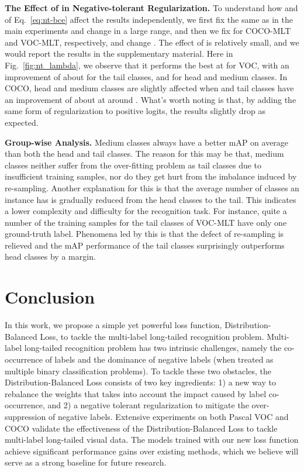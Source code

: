 \documentclass[runningheads]{llncs}
\begin{document}
\noindent\textbf{The Effect of  in Negative-tolerant Regularization.}
To understand how  and  of Eq.~\ref{eq:nt-bce} affect the results independently, we first fix  the same as in the main experiments and change  in a large range, and then we fix  for COCO-MLT and VOC-MLT, respectively, and change .
The effect of  is relatively small, and we would report the results in the supplementary material.
Here in Fig.~\ref{fig:nt_lambda}, we observe that it performs the best at  for VOC, with an improvement of about  for the tail classes, and  for head and medium classes. In COCO, head and medium classes are slightly affected when  and tail classes have an improvement of about  at around .
What's worth noting is that, by adding the same form of regularization to positive logits, the results slightly drop as expected.

\noindent\textbf{Group-wise Analysis.}
Medium classes always have a better mAP on average than both the head and tail classes.
The reason for this may be that, medium classes neither suffer from the over-fitting problem as tail classes due to insufficient training samples, nor do they get hurt from the imbalance induced by re-sampling.
Another explanation for this is that the average number of classes an instance has is gradually reduced from the head classes to the tail. This indicates a lower complexity and difficulty for the recognition task. 
For instance, quite a number of the training samples for the tail classes of VOC-MLT have only one ground-truth label. Phenomena led by this is that the defect of re-sampling is relieved and the mAP performance of the tail classes surprisingly outperforms head classes by a margin.
 

\section{Conclusion}
\label{sec:conclusion}

In this work, we propose a simple yet powerful loss function, Distribution-Balanced Loss, to tackle the multi-label long-tailed recognition problem. Multi-label long-tailed recognition problem has two intrinsic challenges, namely the co-occurrence of labels and the dominance of negative labels (when treated as multiple binary classification problems). To tackle these two obstacles, the Distribution-Balanced Loss consists of two key ingredients: 1) a new way to rebalance the weights that takes into account the impact caused by label co-occurrence, and 2) a negative tolerant regularization to mitigate the over-suppression of negative labels. Extensive experiments on both Pascal VOC and COCO validate the effectiveness of the Distribution-Balanced Loss to tackle multi-label long-tailed visual data. The models trained with our new loss function achieve significant performance gains over existing methods, which we believe will serve as a strong baseline for future research.
\end{document}
